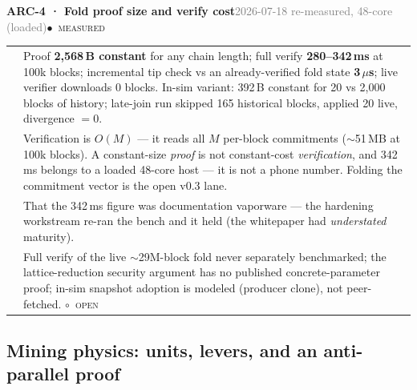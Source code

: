 \documentclass[10pt,a4paper]{article}
\makeatletter
\newcommand{\stM}{\textcolor{sigilcyan}{$\bullet$}~{\scriptsize\textcolor{sigilcyan}{\textsc{measured}}}}
\newcommand{\stO}{\textcolor{sigilamber}{$\circ$}~{\scriptsize\textcolor{sigilamber}{\textsc{open}}}}
\newcommand{\measured}[1]{\textcolor{sigilcyan}{\textbf{#1}}}
\newcommand{\frow}[2]{{\footnotesize\textcolor{gray}{\textsc{#1}}}\;&\small #2\\}
\newenvironment{mentry}[4]{%
\begin{tcolorbox}[enhanced,breakable,colback=white,colframe=slate,boxrule=0.6pt,arc=2pt,
  left=8pt,right=8pt,top=6pt,bottom=6pt,
  borderline west={3pt}{0pt}{sigilcyan!70!slate}]
{\small\textbf{#1 · #2}\hfill{\footnotesize\textcolor{gray}{#3}}\quad#4}\\[4pt]
\begin{tabular}{@{}>{\raggedleft\arraybackslash}p{1.8cm}p{13.2cm}@{}}
}{%
\end{tabular}
\end{tcolorbox}\vspace{2pt}}
\makeatother
\begin{document}
\begin{mentry}{ARC-4}{Fold proof size and verify cost}{2026-07-18 re-measured, 48-core (loaded)}{\stM}
\frow{result}{Proof \measured{2{,}568\,B constant} for any chain length; full verify
\measured{280--342\,ms} at 100k blocks; incremental tip check vs an already-verified fold
state \measured{3\,$\mu$s}; live verifier downloads 0 blocks. In-sim variant: 392\,B
constant for 20 vs 2{,}000 blocks of history; late-join run skipped 165 historical blocks,
applied 20 live, divergence $=0$.}
\frow{caveat}{Verification is $O(M)$ --- it reads all $M$ per-block commitments
($\sim$51\,MB at 100k blocks). A constant-size \emph{proof} is not constant-cost
\emph{verification}, and 342\,ms belongs to a loaded 48-core host --- it is not a phone
number. Folding the commitment vector is the open v0.3 lane.}
\frow{ruled out}{That the 342\,ms figure was documentation vaporware --- the hardening
workstream re-ran the bench and it held (the whitepaper had \emph{understated} maturity).}
\frow{open}{Full verify of the live $\sim$29M-block fold never separately benchmarked;
the lattice-reduction security argument has no published concrete-parameter proof;
in-sim snapshot adoption is modeled (producer clone), not peer-fetched. \stO}
\end{mentry}

\subsection{Mining physics: units, levers, and an anti-parallel proof}
\end{document}
